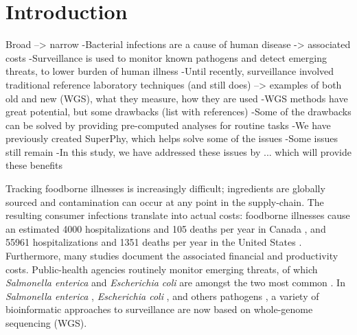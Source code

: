 \documentclass[a4,center,fleqn]{NAR}
\begin{document}
\section{Introduction}
Broad --> narrow
-Bacterial infections are a cause of human disease -> associated costs
-Surveillance is used to monitor known pathogens and detect emerging threats, to lower burden of human illness
-Until recently, surveillance involved traditional reference laboratory techniques (and still does) --> examples of both old and new (WGS), what they measure, how they are used
-WGS methods have great potential, but some drawbacks (list with references)
-Some of the drawbacks can be solved by providing pre-computed analyses for routine tasks
-We have previously created SuperPhy, which helps solve some of the issues
-Some issues still remain
-In this study, we have addressed these issues by ... which will provide these benefits

Tracking foodborne illnesses is increasingly difficult; ingredients are globally sourced and contamination can occur at any point in the supply-chain.
The resulting consumer infections translate into actual costs: foodborne illnesses cause an estimated 4000 hospitalizations and 105 deaths per year in Canada \cite{thomas2015estimates}, and 55961 hospitalizations and 1351 deaths per year in the United States \cite{scallan2011foodborne}.
Furthermore, many studies \cite{todd1989costs,scharff2010health} document the associated financial and productivity costs.
Public-health agencies routinely monitor emerging threats, of which \textit{Salmonella enterica} and \textit{Escherichia coli} are amongst the two most common \cite{kozak2013foodborne}.
In \textit{Salmonella enterica} \cite{bell2016recent}, \textit{Escherichia coli} \cite{fratamico2016advances}, and others pathogens \cite{ronholm2016navigating}, a variety of bioinformatic approaches to surveillance are now based on whole-genome sequencing (WGS).
\end{document}
